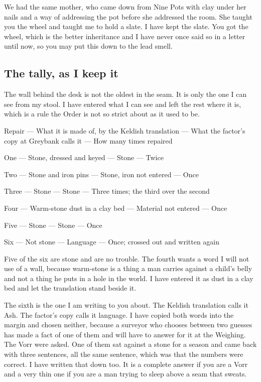 \documentclass{design/chronicle}
\begin{document}
We had the same mother, who came down from Nine Pots with clay under her nails and a way of addressing the pot before she addressed the room. She taught you the wheel and taught me to hold a slate. I have kept the slate. You got the wheel, which is the better inheritance and I have never once said so in a letter until now, so you may put this down to the lead smell.

\subsection*{The tally, as I keep it}

The wall behind the desk is not the oldest in the seam. It is only the one I can see from my stool. I have entered what I can see and left the rest where it is, which is a rule the Order is not so strict about as it used to be.

Repair — What it is made of, by the Keldish translation — What the factor’s copy at Greybank calls it — How many times repaired\par

One — Stone, dressed and keyed — Stone — Twice\par

Two — Stone and iron pins — Stone, iron not entered — Once\par

Three — Stone — Stone — Three times; the third over the second\par

Four — Warm-stone dust in a clay bed — Material not entered — Once\par

Five — Stone — Stone — Once\par

Six — Not stone — Language — Once; crossed out and written again\par

Five of the six are stone and are no trouble. The fourth wants a word I will not use of a wall, because warm-stone is a thing a man carries against a child’s belly and not a thing he puts in a hole in the world. I have entered it as dust in a clay bed and let the translation stand beside it.

The sixth is the one I am writing to you about. The Keldish translation calls it Ash. The factor’s copy calls it language. I have copied both words into the margin and chosen neither, because a surveyor who chooses between two guesses has made a fact of one of them and will have to answer for it at the Weighing. The Vorr were asked. One of them sat against a stone for a season and came back with three sentences, all the same sentence, which was that the numbers were correct. I have written that down too. It is a complete answer if you are a Vorr and a very thin one if you are a man trying to sleep above a seam that sweats.
\end{document}

